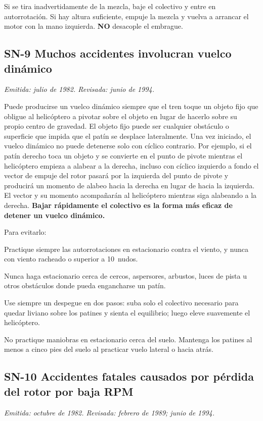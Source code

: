 Si se tira inadvertidamente de la mezcla, baje el colectivo y entre en autorrotación. Si hay altura suficiente, empuje la mezcla y vuelva a arrancar el motor con la mano izquierda. \textbf{NO} desacople el embrague.

\subsection*{SN-9 \quad Muchos accidentes involucran vuelco dinámico}
{\small\textit{Emitida: julio de 1982. Revisada: junio de 1994.}}

Puede producirse un vuelco dinámico siempre que el tren toque un objeto fijo que obligue al helicóptero a pivotar sobre el objeto en lugar de hacerlo sobre su propio centro de gravedad. El objeto fijo puede ser cualquier obstáculo o superficie que impida que el patín se desplace lateralmente. Una vez iniciado, el vuelco dinámico no puede detenerse solo con cíclico contrario. Por ejemplo, si el patín derecho toca un objeto y se convierte en el punto de pivote mientras el helicóptero empieza a alabear a la derecha, incluso con cíclico izquierdo a fondo el vector de empuje del rotor pasará por la izquierda del punto de pivote y producirá un momento de alabeo hacia la derecha en lugar de hacia la izquierda. El vector y su momento acompañarán al helicóptero mientras siga alabeando a la derecha. \textbf{Bajar rápidamente el colectivo es la forma más eficaz de detener un vuelco dinámico.}

Para evitarlo:
\begin{pasos}
\item Practique siempre las autorrotaciones en estacionario contra el viento, y nunca con viento racheado o superior a 10~nudos.
\item Nunca haga estacionario cerca de cercos, aspersores, arbustos, luces de pista u otros obstáculos donde pueda engancharse un patín.
\item Use siempre un despegue en dos pasos: suba solo el colectivo necesario para quedar liviano sobre los patines y sienta el equilibrio; luego eleve suavemente el helicóptero.
\item No practique maniobras en estacionario cerca del suelo. Mantenga los patines al menos a cinco pies del suelo al practicar vuelo lateral o hacia atrás.
\end{pasos}

\subsection*{SN-10 \quad Accidentes fatales causados por pérdida del rotor por baja RPM}
{\small\textit{Emitida: octubre de 1982. Revisada: febrero de 1989; junio de 1994.}}

